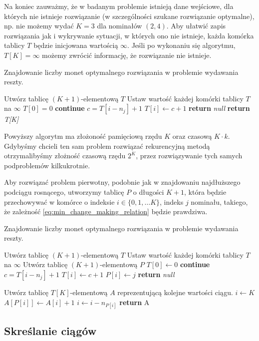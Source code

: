 Na koniec zauważmy, że w badanym problemie
istnieją dane wejściowe, dla których nie 
istnieje rozwiązanie (w szczególności szukane rozwiązanie optymalne),
np. nie możemy wydać $K=3$ dla nominałów $(2, 4)$. 
Aby ułatwić zapis rozwiązania jak i wykrywanie sytuacji, w których
ono nie istnieje, każda komórka tablicy $T$ będzie inicjowana
wartością $\infty$. Jeśli po wykonaniu się algorytmu, $T[K] = \infty$
możemy zwrócić informację, że rozwiązanie nie istnieje.

\begin{algorithm}[H]
	\caption{Znajdowanie liczby monet optymalnego 
		rozwiązania w problemie wydawania reszty.}\label{MinCoinsCountChangeMaking}
	\begin{algorithmic}[1]
		\State Utwórz tablicę $(K+1)$-elementową $T$
		\State Ustaw wartość każdej komórki tablicy $T$ na $\infty$
		\State $T[0] = 0$
		 \textbf{continue}
		\EndIf
		\State $c = T[i - n_j] + 1$
		 $T[i] \gets c + 1$
		\EndIf
		\EndFor
		\EndFor
		 \textbf{return} \textit{null}
		\EndIf
		\State \textbf{return} \textit{T[K]}
		\EndProcedure
	\end{algorithmic}
\end{algorithm}

Powyższy algorytm ma złożoność pamięciową rzędu $K$ oraz czasową $K\cdot k$. 
Gdybyśmy chcieli ten sam problem rozwiązać rekurencyjną metodą otrzymalibyśmy
złożność czasową rzędu $2^K$, przez rozwiązywanie tych samych podproblemów kilkukrotnie.

Aby rozwiązać problem pierwotny, podobnie jak w znajdowaniu najdłuższego
podciągu rosnącego, utworzymy tablicę $P$ o długości $K+1$,
która będzie przechowywać w komórce o indeksie $i \in \{0, 1, \ldots K\}$, indeks $j$
nominału, takiego, że zależność \eqref{eq:min_change_making_relation}
będzie prawdziwa.

\begin{algorithm}[H]
	\caption{Znajdowanie liczby monet optymalnego 
		rozwiązania w problemie wydawania reszty.}\label{ChangeMaking}
	\begin{algorithmic}[1]
		\State Utwórz tablicę $(K+1)$-elementową $T$
		\State Ustaw wartość każdej komórki tablicy $T$ na $\infty$
		\State Utwórz tablicę $(K+1)$-elementową $P$
		\State $T[0] \gets 0$
		 \textbf{continue}
		\EndIf
		\State $c = T[i - n_j] + 1$
		\State $T[i] \gets c + 1$
		\State $P[i] \gets j$
		\EndIf
		\EndFor
		\EndFor
		 \textbf{return} \textit{null}
		\EndIf
		
		\State Utwórz tablicę $T[K]$-elementową $A$ reprezentującą
		kolejne wartości ciągu.
		\State $i \gets K$
		\State $A[P[i]] \gets A[i] + 1$
		\State $i \gets i - n_{P[i]}$
		\EndWhile
		\State \textbf{return} A
		\EndProcedure
	\end{algorithmic}
\end{algorithm}

\subsection{Skreślanie ciągów}